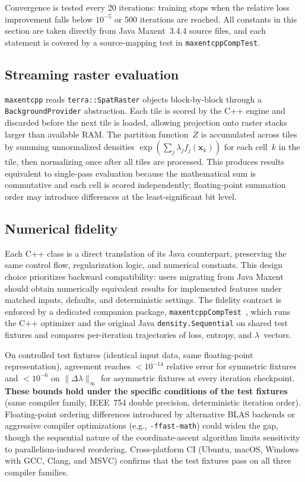 \documentclass[10pt,letterpaper]{article}
\begin{document}
Convergence is tested every 20 iterations: training stops when the
relative loss improvement falls below $10^{-5}$ or 500 iterations are
reached.
All constants in this section are taken directly from Java Maxent~3.4.4
source files, and each statement is covered by a source-mapping test in
\texttt{maxentcppCompTest}.

\subsection*{Streaming raster evaluation}

\texttt{maxentcpp} reads \texttt{terra::SpatRaster} objects
block-by-block through a \texttt{BackgroundProvider} abstraction.
Each tile is scored by the C++ engine and discarded before the next tile
is loaded, allowing projection onto raster stacks larger than available
RAM\@.
The partition function~$Z$ is accumulated across tiles by summing
unnormalized densities
$\exp(\sum_j \lambda_j f_j(\mathbf{x}_k))$ for each cell~$k$ in the
tile, then normalizing once after all tiles are processed.
This produces results equivalent to single-pass evaluation because the
mathematical sum is commutative and each cell is scored independently;
floating-point summation order may introduce differences at the
least-significant bit level.

\subsection*{Numerical fidelity}

Each C++ class is a direct translation of its Java counterpart,
preserving the same control flow, regularization logic, and numerical
constants.
This design choice prioritizes backward compatibility: users migrating
from Java Maxent should obtain numerically equivalent results for
implemented features under matched inputs, defaults, and deterministic
settings.
The fidelity contract is enforced by a dedicated companion package,
\texttt{maxentcppCompTest}~\cite{maxentcppCompTest2025}, which runs the
C++ optimizer and the original Java \texttt{density.Sequential} on
shared test fixtures and compares per-iteration trajectories of loss,
entropy, and $\lambda$~vectors.

On controlled test fixtures (identical input data, same floating-point
representation), agreement reaches $< 10^{-14}$ relative error for
symmetric fixtures and $< 10^{-6}$ on
$\|\Delta\lambda\|_\infty$ for asymmetric fixtures at every iteration
checkpoint.
\textbf{These bounds hold under the specific conditions of the test
fixtures} (same compiler family, IEEE~754 double precision, deterministic
iteration order).
Floating-point ordering differences introduced by alternative BLAS
backends or aggressive compiler optimizations (e.g., \texttt{-ffast-math})
could widen the gap, though the sequential nature of the coordinate-ascent
algorithm limits sensitivity to parallelism-induced reordering.
Cross-platform CI (Ubuntu, macOS, Windows with GCC, Clang, and MSVC)
confirms that the test fixtures pass on all three compiler families.
\end{document}
